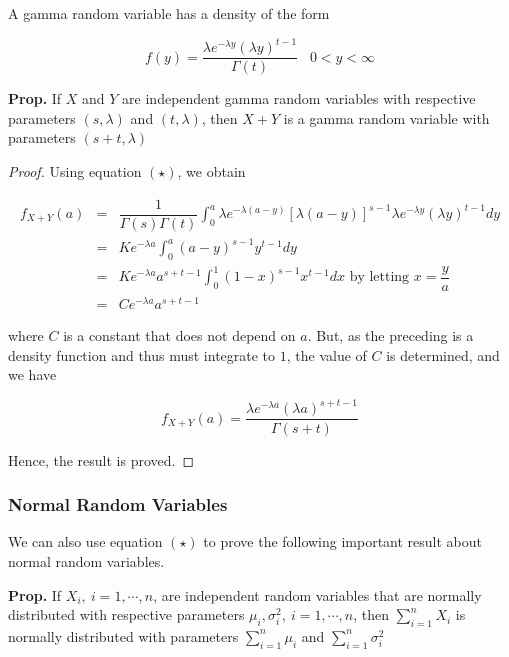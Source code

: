 A gamma random variable has a density of the form

$$f(y) = \dfrac{\lambda e^{- \lambda y}(\lambda y)^{t - 1}}{\Gamma(t)} \hspace{10pt} 0 < y < \infty$$

\textbf{Prop.} If $X$ and $Y$ are independent gamma random variables with respective parameters $(s , \lambda)$ and $(t,\lambda )$, then $X + Y$ is a gamma random variable with parameters $(s + t,\lambda)$

\begin{proof}
	Using equation $(\star)$, we obtain
	
	\begin{eqnarray*}
		f_{X + Y}(a) &=& \dfrac{1}{\Gamma(s)\Gamma(t)}\int^a_0 \lambda e^{-\lambda (a - y)}[\lambda (a - y)]^{s - 1}\lambda e^{-\lambda y}(\lambda y)^{t - 1}dy\\
		&=&K e^{-\lambda a} \int^a_0 (a - y)^{s - 1}y^{t - 1}dy\\
		&=& Ke^{-\lambda a}a^{s + t - 1}\int^1_0 (1 - x)^{s - 1}x^{t - 1}dx \text{ by letting } x = \dfrac{y}{a}\\
		&=&Ce^{-\lambda a}a^{s + t - 1}
	\end{eqnarray*}
	
	where $C$ is a constant that does not depend on $a$. But, as the preceding is a density function and thus must integrate to $1$, the value of $C$ is determined, and we have
	
	$$f_{X + Y}(a) = \dfrac{\lambda e^{-\lambda a}(\lambda a )^{s + t -1}}{\Gamma(s + t)}$$
	
	Hence, the result is proved.
\end{proof}

\subsubsection*{Normal Random Variables}

We can also use equation $(\star)$ to prove the following important result about normal random variables.

\textbf{Prop.} If $X_i, ~ i = 1,\cdots,n$, are independent random variables that are normally distributed with respective parameters $\mu_i,\sigma_i^2,~ i = 1,\cdots,n$, then $\sum^n_{i = 1}X_i$ is normally distributed with parameters $\sum^n_{i = 1}\mu_i$ and $\sum^n_{i = 1}\sigma_i^2$

